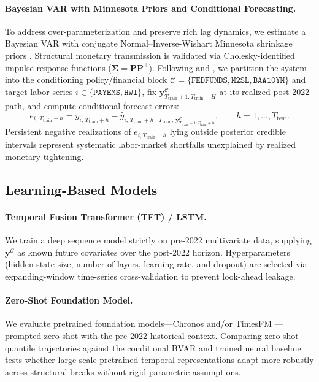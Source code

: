 \documentclass[11pt,a4paper]{article}
\begin{document}
\paragraph{Bayesian VAR with Minnesota Priors and Conditional Forecasting.}
To address over-parameterization and preserve rich lag dynamics, we estimate a Bayesian VAR with conjugate Normal--Inverse-Wishart Minnesota shrinkage priors \citep{giannone2015prior}. Structural monetary transmission is validated via Cholesky-identified impulse response functions ($\boldsymbol{\Sigma} = \mathbf{P}\mathbf{P}^\top$). Following \citet{waggoner1999conditional} and \citet{banbura2015conditional}, we partition the system into the conditioning policy/financial block $\mathcal{C} = \{\texttt{FEDFUNDS}, \texttt{M2SL}, \texttt{BAA10YM}\}$ and target labor series $i \in \{\texttt{PAYEMS}, \texttt{HWI}\}$, fix $\mathbf{y}^{\mathcal{C}}_{T_{\text{train}}+1:T_{\text{train}}+H}$ at its realized post-2022 path, and compute conditional forecast errors:
\begin{equation}
  e_{i,\, T_{\text{train}}+h} = y_{i,\, T_{\text{train}}+h} - \hat{y}_{i,\, T_{\text{train}}+h \mid T_{\text{train}},\, \mathbf{y}^{\mathcal{C}}_{T_{\text{train}}+1:T_{\text{train}}+h}},
  \qquad h = 1,\dots,T_{\text{test}}.
  \label{eq:cond_err}
\end{equation}
Persistent negative realizations of $e_{i,T_{\text{train}}+h}$ lying outside posterior credible intervals represent systematic labor-market shortfalls unexplained by realized monetary tightening.

\subsection{Learning-Based Models}

\paragraph{Temporal Fusion Transformer (TFT) / LSTM.}
We train a deep sequence model \citep{lim2021temporal} strictly on pre-2022 multivariate data, supplying $\mathbf{y}^{\mathcal{C}}$ as known future covariates over the post-2022 horizon. Hyperparameters (hidden state size, number of layers, learning rate, and dropout) are selected via expanding-window time-series cross-validation to prevent look-ahead leakage.

\paragraph{Zero-Shot Foundation Model.}
We evaluate pretrained foundation models---Chronos \citep{ansari2024chronos} and/or TimesFM \citep{das2024decoder}---prompted zero-shot with the pre-2022 historical context. Comparing zero-shot quantile trajectories against the conditional BVAR and trained neural baseline tests whether large-scale pretrained temporal representations adapt more robustly across structural breaks without rigid parametric assumptions.
\end{document}

